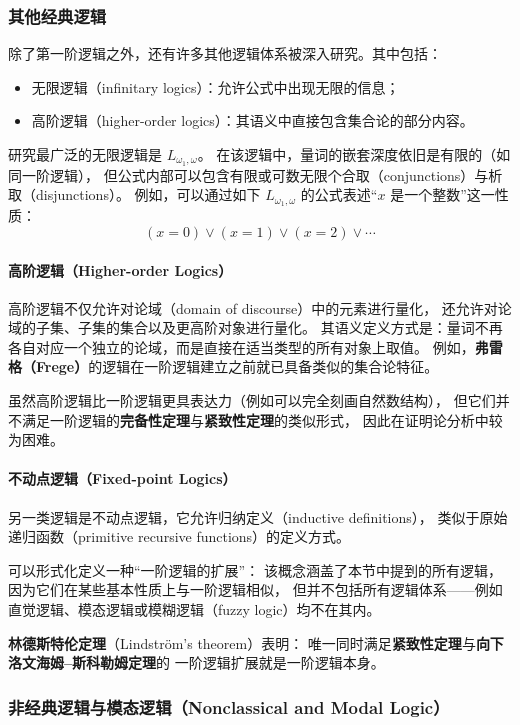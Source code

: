 \subsubsection{其他经典逻辑}
除了第一阶逻辑之外，还有许多其他逻辑体系被深入研究。其中包括：
\begin{itemize}
  \item 无限逻辑（infinitary logics）：允许公式中出现无限的信息；
  \item 高阶逻辑（higher-order logics）：其语义中直接包含集合论的部分内容。
\end{itemize}
研究最广泛的无限逻辑是 \( L_{\omega_{1}, \omega} \)。  
在该逻辑中，量词的嵌套深度依旧是有限的（如同一阶逻辑），  
但公式内部可以包含有限或可数无限个合取（conjunctions）与析取（disjunctions）。  
例如，可以通过如下 \( L_{\omega_{1}, \omega} \) 的公式表述“\(x\) 是一个整数”这一性质：
\[
(x = 0) \lor (x = 1) \lor (x = 2) \lor \cdots
\]

\paragraph{高阶逻辑（Higher-order Logics）}
高阶逻辑不仅允许对论域（domain of discourse）中的元素进行量化，  
还允许对论域的子集、子集的集合以及更高阶对象进行量化。  
其语义定义方式是：量词不再各自对应一个独立的论域，而是直接在适当类型的所有对象上取值。  
例如，\textbf{弗雷格（Frege）}的逻辑在一阶逻辑建立之前就已具备类似的集合论特征。

虽然高阶逻辑比一阶逻辑更具表达力（例如可以完全刻画自然数结构），  
但它们并不满足一阶逻辑的\textbf{完备性定理}与\textbf{紧致性定理}的类似形式，  
因此在证明论分析中较为困难。

\paragraph{不动点逻辑（Fixed-point Logics）}
另一类逻辑是不动点逻辑，它允许归纳定义（inductive definitions），
类似于原始递归函数（primitive recursive functions）的定义方式。

可以形式化定义一种“一阶逻辑的扩展”：
该概念涵盖了本节中提到的所有逻辑，
因为它们在某些基本性质上与一阶逻辑相似，
但并不包括所有逻辑体系——例如直觉逻辑、模态逻辑或模糊逻辑（fuzzy logic）均不在其内。

\textbf{林德斯特伦定理}（Lindström's theorem）表明：
唯一同时满足\textbf{紧致性定理}与\textbf{向下洛文海姆–斯科勒姆定理}的
一阶逻辑扩展就是一阶逻辑本身。

\subsubsection{非经典逻辑与模态逻辑（Nonclassical and Modal Logic）}

